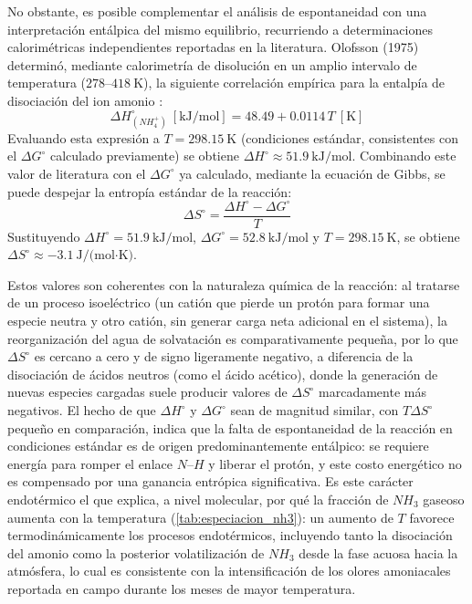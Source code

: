 \documentclass[fleqn]{jaes}
\begin{document}
No obstante, es posible complementar el análisis de espontaneidad con una interpretación entálpica del mismo equilibrio, recurriendo a determinaciones calorimétricas independientes reportadas en la literatura. Olofsson (1975) determinó, mediante calorimetría de disolución en un amplio intervalo de temperatura ($278$--$418~\text{K}$), la siguiente correlación empírica para la entalpía de disociación del ion amonio \cite{Olofsson1975}:
\begin{equation}
\Delta H^\circ_{(NH_4^+)}~[\text{kJ/mol}] = 48.49 + 0.0114\,T~[\text{K}]
\label{eq:dh_olofsson}
\end{equation}
Evaluando esta expresión a $T = 298.15~\text{K}$ (condiciones estándar, consistentes con el $\Delta G^\circ$ calculado previamente) se obtiene $\Delta H^\circ \approx 51.9~\text{kJ/mol}$. Combinando este valor de literatura con el $\Delta G^\circ$ ya calculado, mediante la ecuación de Gibbs, se puede despejar la entropía estándar de la reacción:
\begin{equation}
\Delta S^\circ = \frac{\Delta H^\circ - \Delta G^\circ}{T}
\label{eq:ds_derivado}
\end{equation}
Sustituyendo $\Delta H^\circ = 51.9~\text{kJ/mol}$, $\Delta G^\circ = 52.8~\text{kJ/mol}$ y $T=298.15~\text{K}$, se obtiene $\Delta S^\circ \approx -3.1~\text{J/(mol·K)}$.

Estos valores son coherentes con la naturaleza química de la reacción: al tratarse de un proceso isoeléctrico (un catión que pierde un protón para formar una especie neutra y otro catión, sin generar carga neta adicional en el sistema), la reorganización del agua de solvatación es comparativamente pequeña, por lo que $\Delta S^\circ$ es cercano a cero y de signo ligeramente negativo, a diferencia de la disociación de ácidos neutros (como el ácido acético), donde la generación de nuevas especies cargadas suele producir valores de $\Delta S^\circ$ marcadamente más negativos. El hecho de que $\Delta H^\circ$ y $\Delta G^\circ$ sean de magnitud similar, con $T\Delta S^\circ$ pequeño en comparación, indica que la falta de espontaneidad de la reacción en condiciones estándar es de origen predominantemente entálpico: se requiere energía para romper el enlace $N$--$H$ y liberar el protón, y este costo energético no es compensado por una ganancia entrópica significativa. Es este carácter endotérmico el que explica, a nivel molecular, por qué la fracción de $NH_3$ gaseoso aumenta con la temperatura (\cref{tab:especiacion_nh3}): un aumento de $T$ favorece termodinámicamente los procesos endotérmicos, incluyendo tanto la disociación del amonio como la posterior volatilización de $NH_3$ desde la fase acuosa hacia la atmósfera, lo cual es consistente con la intensificación de los olores amoniacales reportada en campo durante los meses de mayor temperatura.
\end{document}
